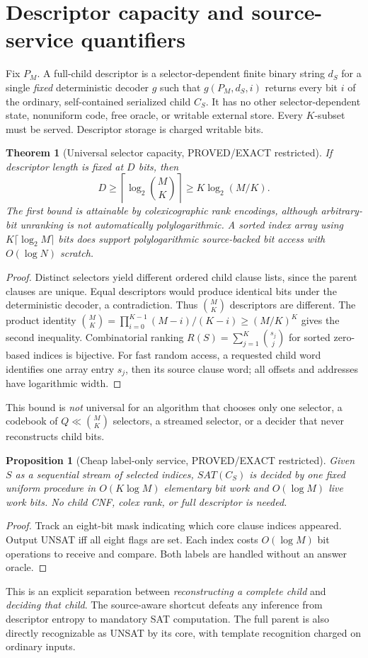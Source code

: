 \documentclass[11pt]{article}
\newtheorem{theorem}{Theorem}
\newtheorem{proposition}{Proposition}
\begin{document}
\section{Descriptor capacity and source-service quantifiers}
Fix $P_M$. A full-child descriptor is a selector-dependent finite binary string $d_S$ for a single \emph{fixed} deterministic decoder $g$ such that $g(P_M,d_S,i)$ returns every bit $i$ of the ordinary, self-contained serialized child $C_S$. It has no other selector-dependent state, nonuniform code, free oracle, or writable external store. Every $K$-subset must be served. Descriptor storage is charged writable bits.
\begin{theorem}[Universal selector capacity, PROVED/EXACT restricted]
If descriptor length is fixed at $D$ bits, then
\[
D\ge\left\lceil\log_2\binom MK\right\rceil
\ge K\log_2(M/K).
\]
The first bound is attainable by colexicographic rank encodings, although arbitrary-bit unranking is not automatically polylogarithmic. A sorted index array using $K\lceil\log_2 M\rceil$ bits does support polylogarithmic source-backed bit access with $O(\log N)$ scratch.
\end{theorem}
\begin{proof}
Distinct selectors yield different ordered child clause lists, since the parent clauses are unique. Equal descriptors would produce identical bits under the deterministic decoder, a contradiction. Thus $\binom MK$ descriptors are different. The product identity $\binom MK=\prod_{i=0}^{K-1}(M-i)/(K-i)\ge(M/K)^K$ gives the second inequality. Combinatorial ranking $R(S)=\sum_{j=1}^K\binom{s_j}{j}$ for sorted zero-based indices is bijective. For fast random access, a requested child word identifies one array entry $s_j$, then its source clause word; all offsets and addresses have logarithmic width.
\end{proof}
This bound is \emph{not} universal for an algorithm that chooses only one selector, a codebook of $Q\ll\binom MK$ selectors, a streamed selector, or a decider that never reconstructs child bits.
\begin{proposition}[Cheap label-only service, PROVED/EXACT restricted]
Given $S$ as a sequential stream of selected indices, $SAT(C_S)$ is decided by one fixed uniform procedure in $O(K\log M)$ elementary bit work and $O(\log M)$ live work bits. No child CNF, colex rank, or full descriptor is needed.
\end{proposition}
\begin{proof}
Track an eight-bit mask indicating which core clause indices appeared. Output UNSAT iff all eight flags are set. Each index costs $O(\log M)$ bit operations to receive and compare. Both labels are handled without an answer oracle.
\end{proof}
This is an explicit separation between \emph{reconstructing a complete child} and \emph{deciding that child}. The source-aware shortcut defeats any inference from descriptor entropy to mandatory SAT computation. The full parent is also directly recognizable as UNSAT by its core, with template recognition charged on ordinary inputs.
\end{document}

